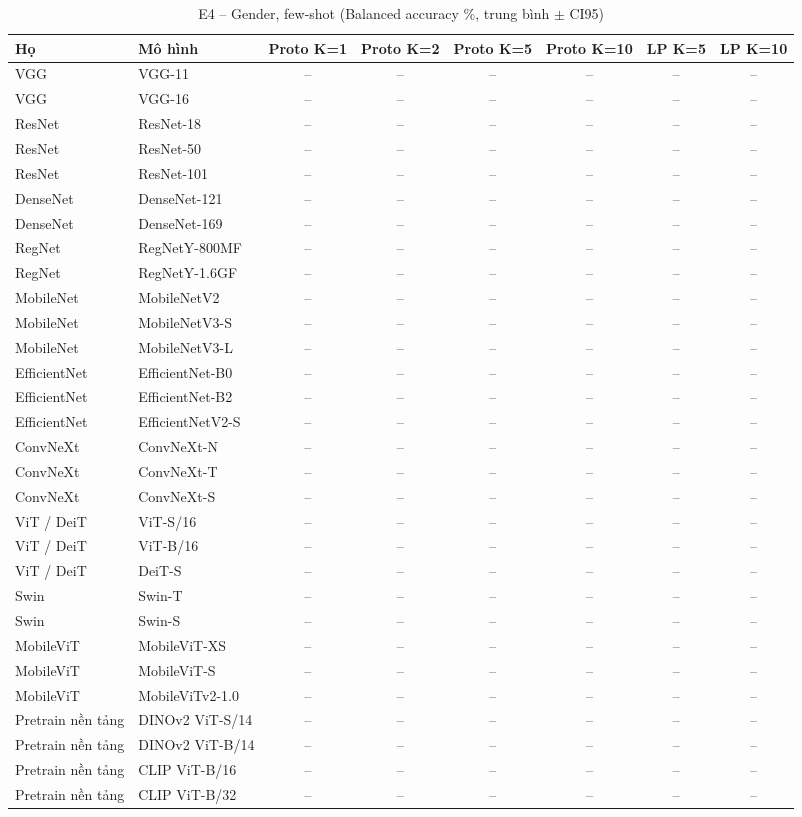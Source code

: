 \begin{table}[t]
\centering
\small
\caption{E4 – Gender, few-shot (Balanced accuracy \%, trung bình $\pm$ CI95)}
\begin{tabular}{llcccccc}
\toprule
Họ & Mô hình & Proto K=1 & Proto K=2 & Proto K=5 & Proto K=10 & LP K=5 & LP K=10 \\
\midrule
VGG & VGG-11 & – & – & – & – & – & – \\
VGG & VGG-16 & – & – & – & – & – & – \\
ResNet & ResNet-18 & – & – & – & – & – & – \\
ResNet & ResNet-50 & – & – & – & – & – & – \\
ResNet & ResNet-101 & – & – & – & – & – & – \\
DenseNet & DenseNet-121 & – & – & – & – & – & – \\
DenseNet & DenseNet-169 & – & – & – & – & – & – \\
RegNet & RegNetY-800MF & – & – & – & – & – & – \\
RegNet & RegNetY-1.6GF & – & – & – & – & – & – \\
MobileNet & MobileNetV2 & – & – & – & – & – & – \\
MobileNet & MobileNetV3-S & – & – & – & – & – & – \\
MobileNet & MobileNetV3-L & – & – & – & – & – & – \\
EfficientNet & EfficientNet-B0 & – & – & – & – & – & – \\
EfficientNet & EfficientNet-B2 & – & – & – & – & – & – \\
EfficientNet & EfficientNetV2-S & – & – & – & – & – & – \\
ConvNeXt & ConvNeXt-N & – & – & – & – & – & – \\
ConvNeXt & ConvNeXt-T & – & – & – & – & – & – \\
ConvNeXt & ConvNeXt-S & – & – & – & – & – & – \\
ViT / DeiT & ViT-S/16 & – & – & – & – & – & – \\
ViT / DeiT & ViT-B/16 & – & – & – & – & – & – \\
ViT / DeiT & DeiT-S & – & – & – & – & – & – \\
Swin & Swin-T & – & – & – & – & – & – \\
Swin & Swin-S & – & – & – & – & – & – \\
MobileViT & MobileViT-XS & – & – & – & – & – & – \\
MobileViT & MobileViT-S & – & – & – & – & – & – \\
MobileViT & MobileViTv2-1.0 & – & – & – & – & – & – \\
Pretrain nền tảng & DINOv2 ViT-S/14 & – & – & – & – & – & – \\
Pretrain nền tảng & DINOv2 ViT-B/14 & – & – & – & – & – & – \\
Pretrain nền tảng & CLIP ViT-B/16 & – & – & – & – & – & – \\
Pretrain nền tảng & CLIP ViT-B/32 & – & – & – & – & – & – \\
\bottomrule
\end{tabular}
\end{table}
